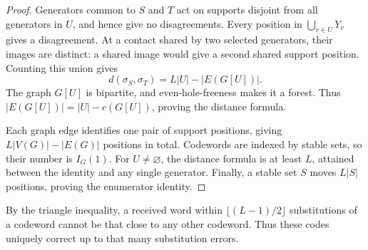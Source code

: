\begin{proof}
Generators common to $S$ and $T$ act on supports disjoint from all
generators in $U$, and hence give no disagreements. Every position in
$\bigcup_{v\in U}Y_v$ gives a disagreement. At a contact shared by two
selected generators, their images are distinct: a shared image would
give a second shared support position. Counting this union gives
\[
 d(\sigma_S,\sigma_T)=L|U|-|E(G[U])|.
\]
The graph $G[U]$ is bipartite, and even-hole-freeness makes it a forest.
Thus $|E(G[U])|=|U|-c(G[U])$, proving the distance formula.

Each graph edge identifies one pair of support positions, giving
$L|V(G)|-|E(G)|$ positions in total. Codewords are indexed by stable
sets, so their number is $I_G(1)$. For $U\ne\varnothing$, the distance
formula is at least $L$, attained between the identity and any single
generator. Finally, a stable set $S$ moves $L|S|$ positions, proving
the enumerator identity.
\end{proof}

By the triangle inequality, a received word within
$\lfloor(L-1)/2\rfloor$ substitutions of a codeword cannot be that close
to any other codeword. Thus these codes uniquely correct up to that
many substitution errors.
